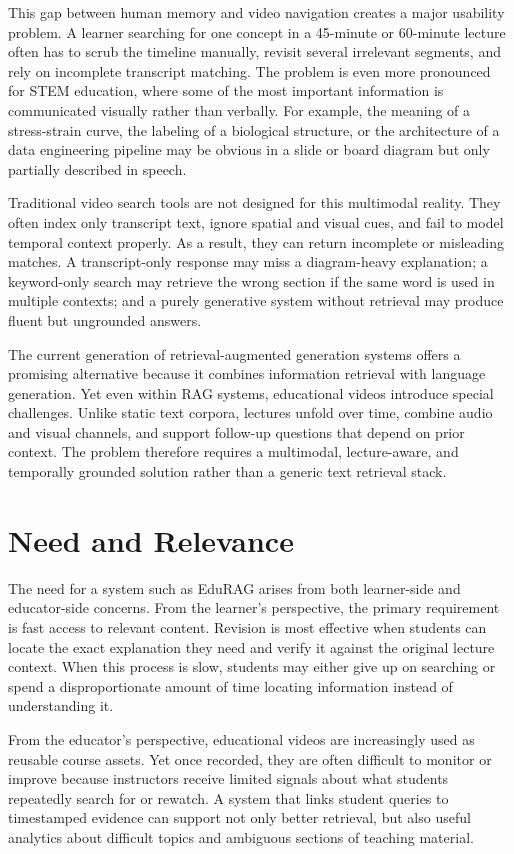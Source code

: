 \documentclass[12pt,a4paper,oneside]{report}
\begin{document}
This gap between human memory and video navigation creates a major usability problem. A learner searching for one concept in a 45-minute or 60-minute lecture often has to scrub the timeline manually, revisit several irrelevant segments, and rely on incomplete transcript matching. The problem is even more pronounced for STEM education, where some of the most important information is communicated visually rather than verbally. For example, the meaning of a stress-strain curve, the labeling of a biological structure, or the architecture of a data engineering pipeline may be obvious in a slide or board diagram but only partially described in speech.

Traditional video search tools are not designed for this multimodal reality. They often index only transcript text, ignore spatial and visual cues, and fail to model temporal context properly. As a result, they can return incomplete or misleading matches. A transcript-only response may miss a diagram-heavy explanation; a keyword-only search may retrieve the wrong section if the same word is used in multiple contexts; and a purely generative system without retrieval may produce fluent but ungrounded answers.

The current generation of retrieval-augmented generation systems offers a promising alternative because it combines information retrieval with language generation. Yet even within RAG systems, educational videos introduce special challenges. Unlike static text corpora, lectures unfold over time, combine audio and visual channels, and support follow-up questions that depend on prior context. The problem therefore requires a multimodal, lecture-aware, and temporally grounded solution rather than a generic text retrieval stack.

\section{Need and Relevance}
The need for a system such as EduRAG arises from both learner-side and educator-side concerns. From the learner's perspective, the primary requirement is fast access to relevant content. Revision is most effective when students can locate the exact explanation they need and verify it against the original lecture context. When this process is slow, students may either give up on searching or spend a disproportionate amount of time locating information instead of understanding it.

From the educator's perspective, educational videos are increasingly used as reusable course assets. Yet once recorded, they are often difficult to monitor or improve because instructors receive limited signals about what students repeatedly search for or rewatch. A system that links student queries to timestamped evidence can support not only better retrieval, but also useful analytics about difficult topics and ambiguous sections of teaching material.
\end{document}
